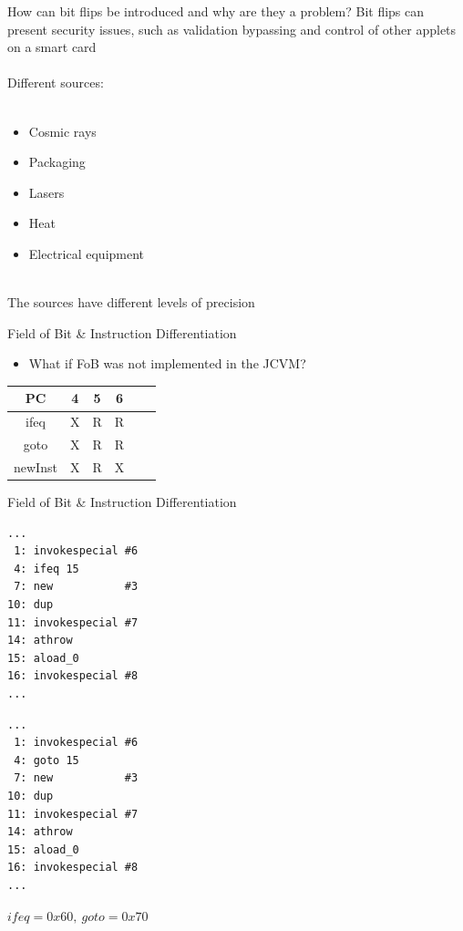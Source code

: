 \begin{frame}[fragile]{\large How can bit flips be introduced and why are they a problem?}
Bit flips can present security issues, such as validation bypassing and control of other applets on a smart card\\~\\
Different sources:\\~\\
	\begin{itemize}
	\item Cosmic rays
	\item Packaging
	\item Lasers
	\item Heat
    \item Electrical equipment\\~\\
	\end{itemize}
	
The sources have different levels of precision
\end{frame}
\begin{frame}[fragile]{Field of Bit \& Instruction Differentiation}
\begin{itemize}
\item What if FoB was not implemented in the JCVM?
\end{itemize}
\begin{table}
\centering
\begin{tabular}{|c|c|c|c|c|c|}
\hline PC & 4 & 5 & 6   \\ 
\hline ifeq & X & R & R \\ 
\hline goto & X & R & R \\ 
\hline newInst & X & R & X \\ 
\hline 
\end{tabular} 
\end{table}
\end{frame}

\begin{frame}[fragile]{Field of Bit \& Instruction Differentiation}
\begin{minipage}{.45\textwidth}
\begin{lstlisting}[frame=single]
...
 1: invokespecial #6
 4: ifeq 15
 7: new           #3
10: dup
11: invokespecial #7
14: athrow
15: aload_0
16: invokespecial #8
...
\end{lstlisting}
\end{minipage}%
\hspace{20px}
\begin{minipage}{0.45\textwidth}
\begin{lstlisting}[frame=single]
...
 1: invokespecial #6
 4: goto 15
 7: new           #3
10: dup
11: invokespecial #7
14: athrow
15: aload_0
16: invokespecial #8
...
\end{lstlisting}
\end{minipage}
\begin{center}
$ifeq = 0x60,\:goto = 0x70$
\end{center}
\end{frame}

